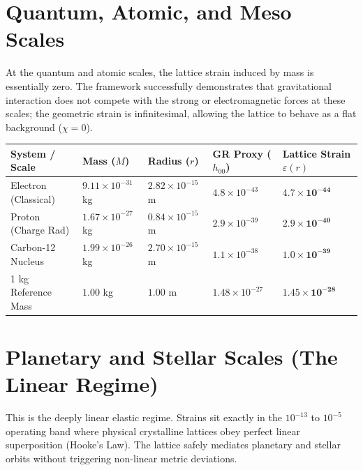 \documentclass[11pt, letterpaper, openany]{book}
\begin{document}
\section{Quantum, Atomic, and Meso Scales}

At the quantum and atomic scales, the lattice strain induced by mass is essentially zero. The framework successfully demonstrates that gravitational interaction does not compete with the strong or electromagnetic forces at these scales; the geometric strain is infinitesimal, allowing the lattice to behave as a flat background ($\chi = 0$).

\begin{center}
\renewcommand{\arraystretch}{1.2}
\small
\begin{tabular}{|p{3.5cm}|p{2cm}|p{2.5cm}|p{2.2cm}|p{2.5cm}|}
\hline
\rowcolor{kishblue!12}
\textbf{System / Scale} & \textbf{Mass ($M$)} & \textbf{Radius ($r$)} & \textbf{GR Proxy ($h_{00}$)} & \textbf{Lattice Strain $\varepsilon(r)$} \\
\hline
Electron (Classical) & $9.11 \times 10^{-31}$ kg & $2.82 \times 10^{-15}$ m & $4.8 \times 10^{-43}$ & $\mathbf{4.7 \times 10^{-44}}$ \\
\hline
Proton (Charge Rad) & $1.67 \times 10^{-27}$ kg & $0.84 \times 10^{-15}$ m & $2.9 \times 10^{-39}$ & $\mathbf{2.9 \times 10^{-40}}$ \\
\hline
Carbon-12 Nucleus & $1.99 \times 10^{-26}$ kg & $2.70 \times 10^{-15}$ m & $1.1 \times 10^{-38}$ & $\mathbf{1.0 \times 10^{-39}}$ \\
\hline
1 kg Reference Mass & $1.00$ kg & $1.00$ m & $1.48 \times 10^{-27}$ & $\mathbf{1.45 \times 10^{-28}}$ \\
\hline
\end{tabular}
\end{center}

\section{Planetary and Stellar Scales (The Linear Regime)}

This is the deeply linear elastic regime. Strains sit exactly in the $10^{-13}$ to $10^{-5}$ operating band where physical crystalline lattices obey perfect linear superposition (Hooke's Law). The lattice safely mediates planetary and stellar orbits without triggering non-linear metric deviations.
\end{document}
